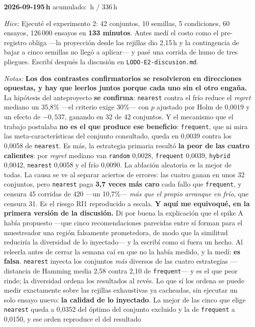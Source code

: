 \documentclass[11pt,letterpaper]{article}
\newcommand{\presupuesto}{336}
\newcommand{\horasacum}{0}
\newcommand{\entrada}[4]{%
  \xdef\horasacum{\fpeval{\horasacum + #2}}%
  \par\medskip
  \noindent\textbf{\color{tecnavy}#1}\quad\textbf{#2\,h}%
  \hfill{\small\color{gris}acumulado: \horasacum\,h / \presupuesto\,h}\par
  \nopagebreak
  \noindent\textit{Hice:} #3\par
  \nopagebreak
  \noindent\textit{Notas:} #4\par
}
\begin{document}
\entrada{2026-09-19}{5}
{Ejecuté el experimento 2: 42 conjuntos, 10 semillas, 5 condiciones, 60 ensayos, 126\,000
 ensayos en \textbf{133 minutos}. Antes medí el costo como el pre-registro obliga —la
 proyección desde las rejillas dio 2,15\,h y la contingencia de bajar a cinco semillas no
 llegó a aplicar— y pasé una corrida de humo de tres pliegues. Escribí después la
 discusión en \texttt{LODO-E2-discusion.md}.}
{\textbf{Los dos contrastes confirmatorios se resolvieron en direcciones opuestas, y hay
 que leerlos juntos porque cada uno sin el otro engaña.} La hipótesis del anteproyecto
 \textbf{se confirma}: \texttt{nearest} contra el frío reduce el \emph{regret} mediano un
 35,8\% —el criterio exige 30\%— con $p$ ajustado por Holm de 0,0019 y un efecto de
 $-0{,}537$, ganando en 32 de 42 conjuntos. Y el mecanismo que el trabajo postulaba
 \textbf{no es el que produce ese beneficio}: \texttt{frequent}, que ni mira las
 meta-características del conjunto consultado, queda en 0,0039 contra los 0,0058 de
 \texttt{nearest}. Es más, la estrategia primaria resultó \textbf{la peor de las cuatro
 calientes}: por \emph{regret} mediano van \texttt{random} 0,0028, \texttt{frequent}
 0,0039, \texttt{hybrid} 0,0042, \texttt{nearest} 0,0058 y el frío 0,0090. La ablación
 aleatoria es la mejor de todas. La causa se ve al separar aciertos de errores: las cuatro
 ganan en unos 32 conjuntos, pero \texttt{nearest} paga \textbf{3,7 veces más caro} cada
 fallo que \texttt{frequent}, y censura 45 corridas de 420 —un 10,7\%— \emph{más que el
 propio arranque en frío}, que censura 31. Es el riesgo RI1 reproducido a escala.
 \textbf{Y aquí me equivoqué, en la primera versión de la discusión.} Di por buena la
 explicación que el spike A había propuesto ---que cinco recomendaciones parecidas entre
 sí forman para el muestreador una región falsamente prometedora, de modo que la
 similitud reduciría la diversidad de lo inyectado--- y la escribí como si fuera un
 hecho. Al releerla antes de cerrar la semana caí en que no la había medido, y la medí:
 \textbf{es falsa}. \texttt{nearest} inyecta los conjuntos \emph{más} diversos de las
 cuatro estrategias ---distancia de Hamming media 2,58 contra 2,10 de
 \texttt{frequent}--- y es el que peor rinde; la diversidad ordena los resultados al
 revés. Lo que sí los ordena se puede medir exactamente sobre las rejillas exhaustivas ya
 cacheadas, sin ejecutar un solo ensayo nuevo: \textbf{la calidad de lo inyectado}. La
 mejor de las cinco que elige \texttt{nearest} queda a 0,0352 del óptimo del conjunto
 excluido y la de \texttt{frequent} a 0,0150, y ese orden reproduce el del resultado
}
\end{document}
